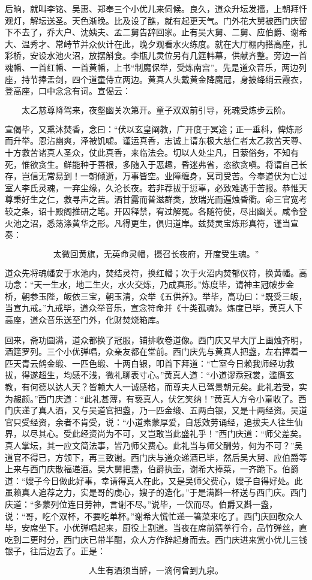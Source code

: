 后晌，就叫李铭、吴惠、郑奉三个小优儿来伺候。良久，道众升坛发擂，上朝拜忏观灯，解坛送圣。天色渐晚。比及设了醮，就有起更天气。门外花大舅被西门庆留下不去了，乔大户、沈姨夫、孟二舅告辞回家。止有吴大舅、二舅、应伯爵、谢希大、温秀才、常峙节并众伙计在此，晚夕观看水火练度。就在大厅棚内搭高座，扎彩桥，安设水池火沼，放摆斛食。李瓶儿灵位另有几筵帏幕，供献齐整。旁边一首魂幡、一首红幡、一首黄幡，上书“制魔保举，受炼南宫”。先是道众音乐，两边列座，持节捧盂剑，四个道童侍立两边。黄真人头戴黄金降魔冠，身披绛绡云霞衣，登高座，口中念念有词。宣偈云：

\[
太乙慈尊降驾来，夜壑幽关次第开。
童子双双前引导，死魂受炼步云阶。
\]

宣偈毕，又熏沐焚香，念曰：“伏以玄皇阐教，广开度于冥途；正一垂科，俾炼形而升举。恩沾幽爽，泽被饥嘘。谨运真香，志诚上请东极大慈仁者太乙救苦天尊、十方救苦诸真人圣众，仗此真香，来临法会。切以人处尘凡，日萦俗务，不知有死，惟欲贪生。鲜能种于善根，多随入于恶趣，昏迷弗省，恣欲贪嗔。将谓自己长存，岂信无常易到！一朝倾逝，万事皆空。业障缠身，冥司受苦。今奉道伏为亡过室人李氏灵魂，一弃尘缘，久沦长夜。若非荐拔于愆辜，必致难逃于苦报。恭惟天尊秉好生之仁，救寻声之苦。洒甘露而普滋群类，放瑞光而遍烛昏衢。命三官宽考较之条，诏十殿阁推研之笔。开囚释禁，宥过解冤。各随符使，尽出幽关。咸令登火池之沼，悉荡涤黄华之形。凡得更生，俱归道岸。兹焚灵宝炼形真符，谨当宣奏：

\[
太微回黄旗，无英命灵幡，
摄召长夜府，开度受生魂。”
\]

道众先将魂幡安于水池内，焚结灵符，换红幡；次于火沼内焚郁仪符，换黄幡。高功念：“天一生水，地二生火，水火交炼，乃成真形。”炼度毕，请神主冠帔步金桥，朝参玉陛，皈依三宝，朝玉清，众举《五供养》。举毕，高功曰：“既受三皈，当宣九戒。”九戒毕，道众举音乐，宣念符命并《十类孤魂》。炼度已毕，黄真人下高座，道众音乐送至门外，化财焚烧箱库。

回来，斋功圆满，道众都换了冠服，铺排收卷道像。西门庆又早大厅上画烛齐明，酒筵罗列。三个小优弹唱，众亲友都在堂前。西门庆先与黄真人把盏，左右捧着一匹天青云鹤金缎、一匹色缎、十两白银，叩首下拜道：“亡室今日赖我师经功救拔，得遂超生，均感不浅，微礼聊表寸心。”黄真人道：“小道谬忝冠裳，滥膺玄教，有何德以达人天？皆赖大人一诚感格，而尊夫人已驾景朝元矣。此礼若受，实为赧颜。”西门庆道：“此礼甚薄，有亵真人，伏乞笑纳！”黄真人方令小童收了。西门庆递了真人酒，又与吴道官把盏，乃一匹金缎、五两白银，又是十两经资。吴道官只受经资，余者不肯受，说：“小道素蒙厚爱，自恁效劳诵经，追拔夫人往生仙界，以尽其心。受此经资尚为不可，又岂敢当此盛礼乎！”西门庆道：“师父差矣。真人掌坛，其一应文简法事，皆乃师父费心。此礼当与师父酬劳，何为不可？”吴道官不得已，方领下，再三致谢。西门庆与道众递酒已毕，然后吴大舅、应伯爵等上来与西门庆散福递酒。吴大舅把盏，伯爵执壶，谢希大捧菜，一齐跪下。伯爵道：“嫂子今日做此好事，幸请得真人在此，又是吴师父费心，嫂子自得好处。此虽赖真人追荐之力，实是哥的虔心，嫂子的造化。”于是满斟一杯送与西门庆。西门庆道：“多蒙列位连日劳神，言谢不尽。”说毕，一饮而尽。伯爵又斟一盏，说：“哥，吃个双杯，不要吃单杯。”谢希大慌忙递一箸菜来吃了。西门庆回敬众人毕，安席坐下。小优弹唱起来，厨役上割道。当夜在席前猜拳行令，品竹弹丝，直吃到二更时分，西门庆已带半酣，众人方作辞起身而去。西门庆进来赏小优儿三钱银子，往后边去了。正是：

\[
人生有酒须当醉，一滴何曾到九泉。
\]

